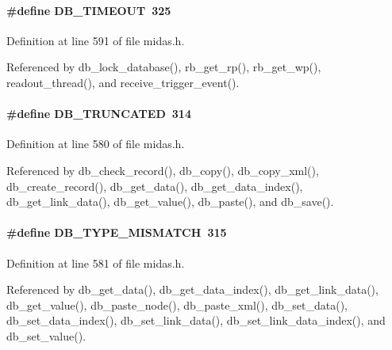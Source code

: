 \paragraph[{DB\_\-TIMEOUT}]{\setlength{\rightskip}{0pt plus 5cm}\#define DB\_\-TIMEOUT~325}\hfill\label{group__err23_gac3c60a757927f22fc91643550d780a85}

\begin{DoxyItemize}
\item 
\end{DoxyItemize}

Definition at line 591 of file midas.h.

Referenced by db\_\-lock\_\-database(), rb\_\-get\_\-rp(), rb\_\-get\_\-wp(), readout\_\-thread(), and receive\_\-trigger\_\-event().
\paragraph[{DB\_\-TRUNCATED}]{\setlength{\rightskip}{0pt plus 5cm}\#define DB\_\-TRUNCATED~314}\hfill\label{group__err23_gaf7d81a3217ef14ed73f3089f51584bd9}

\begin{DoxyItemize}
\item 
\end{DoxyItemize}

Definition at line 580 of file midas.h.

Referenced by db\_\-check\_\-record(), db\_\-copy(), db\_\-copy\_\-xml(), db\_\-create\_\-record(), db\_\-get\_\-data(), db\_\-get\_\-data\_\-index(), db\_\-get\_\-link\_\-data(), db\_\-get\_\-value(), db\_\-paste(), and db\_\-save().
\paragraph[{DB\_\-TYPE\_\-MISMATCH}]{\setlength{\rightskip}{0pt plus 5cm}\#define DB\_\-TYPE\_\-MISMATCH~315}\hfill\label{group__err23_gab284e13875988d7c16d30c8fe7597f5a}

\begin{DoxyItemize}
\item 
\end{DoxyItemize}

Definition at line 581 of file midas.h.

Referenced by db\_\-get\_\-data(), db\_\-get\_\-data\_\-index(), db\_\-get\_\-link\_\-data(), db\_\-get\_\-value(), db\_\-paste\_\-node(), db\_\-paste\_\-xml(), db\_\-set\_\-data(), db\_\-set\_\-data\_\-index(), db\_\-set\_\-link\_\-data(), db\_\-set\_\-link\_\-data\_\-index(), and db\_\-set\_\-value().

